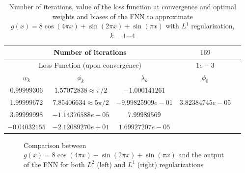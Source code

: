 \documentclass[AMS,STIX1COL]{WileyNJD-v2}
\begin{document}
 \begin{table}[!h]
  \begin{center}
  \begin{tabular}{ |c|c|c|c|c| } 
    \hline
\multicolumn{3}{|c|}{Number of iterations}& $169$  \\
\hline
  \multicolumn{3}{|c|}{Loss Function (upon convergence)} & $1e-3$  \\
\hline
\hline
$w_k$ & $\phi_k$ & $\lambda_k$& $\phi_0$ \\
\hline
$0.99999306$ & $1.57072838 \approx \pi/2$ &$-1.000141261$& \\ 
$1.99999672$&$7.85406634 \approx 5\pi/2$ & $-9.99825909e-01$& $3.82384745e-05$ \\ 
$3.99999998$& $-1.14376588e-05$ & $7.99989569$& \\ 
$ -0.04032155$& $-2.12089270e+01$ & $1.69927207e-05$& \\ 
\hline
\end{tabular}
\caption{\;Number of iterations, value of the loss function at convergence and optimal weights and biases of the FNN to approximate $ g(x) = 8 \cos(4\pi x) + \sin(2\pi x) + \sin(\pi x)$ with $L^1$ regularization, $k = 1\cdots4$}\label{tab:tabpercompL1}
\end{center}
\end{table}
 \begin{figure}[!htb]
    \centering
    \caption{\;Comparison between $g(x) = 8 \cos(4\pi x) + \sin(2\pi x) + \sin(\pi x)$ and the output of the FNN for both $L^2$ (left) and $L^1$ (right) regularizations}
    \label{fig:fourvsNNcompPer}
\end{figure}
\end{document}
